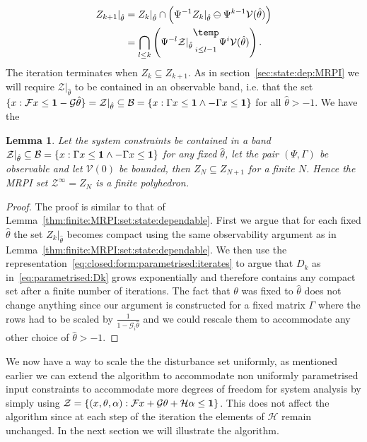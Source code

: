 \documentclass[letterpaper, 10pt, conference]{ieeeconf} %
\newtheorem{thm}{Lemma}[section]
\newcommand{\bigominus}{\raisebox{10pt}{$\temp$}}
\begin{document}
%
\begin{equation}\label{eq:closed:form:parametrised:iterates}
\begin{split}
	Z_{k+1}\vert_{\hat\theta} &= Z_{k}\vert_{\hat\theta}\cap\left(
	\Psi^{-1}Z_k\vert_{\hat\theta}\ominus\Psi^{k-1}\mathcal V(\hat\theta)\right)\\
	&=\bigcap_{l\leq k}\left(\Psi^{-l}\mathcal Z\vert_{\hat\theta}\underset{i\leq l-1}{\bigominus} 
	\Psi^i \mathcal V(\hat\theta)
	\right).
\end{split}
\end{equation}
%
The iteration terminates when $Z_k\subseteq Z_{k+1}$. As in section~\ref{sec:state:dep:MRPI}
we will require $\mathcal Z\vert_{\hat\theta}$ to be contained in an observable band, i.e. that 
the set $\{x:\mathcal Fx \leq {\bf{1}}-\mathcal G\hat\theta\}=\mathcal Z\vert_{\hat\theta}\subseteq
\mathcal B=\{x:\Gamma x\leq {\bf{1}}\wedge -\Gamma x\leq {\bf{1}}\}$ for all $\hat\theta>-1$. We have the
%
\begin{thm}
Let the system constraints be contained in a band $\mathcal Z\vert_{\hat\theta}\subseteq\mathcal 
B=\{x:\Gamma x\leq {\bf{1}}\wedge -\Gamma x\leq {\bf{1}}\}$ for any fixed $\hat\theta$, let the
pair $(\Psi,\Gamma)$ be observable and let $\mathcal V(0)$ be bounded, then $Z_N\subseteq Z_{N+1}$
for a finite $N$. Hence the MRPI set $\mathcal Z^\infty = Z_N$ is a finite polyhedron.
\end{thm}
%
\begin{proof}
The proof is similar to that of Lemma~\ref{thm:finite:MRPI:set:state:dependable}.
First we argue that for each fixed $\hat\theta$ the set $Z_k\vert_{\hat\theta}$ becomes compact using the same
observability argument as in Lemma~\ref{thm:finite:MRPI:set:state:dependable}.
We then use the representation~\eqref{eq:closed:form:parametrised:iterates} to argue that $D_k$ as
in~\eqref{eq:parametrised:Dk} grows exponentially and therefore contains any compact set after a finite number
of iterations. The fact that $\theta$ was fixed to $\hat\theta$ does not change anything since
our argument is constructed for a fixed matrix $\Gamma$ where the rows had to be scaled by 
$\frac{1}{1-\mathcal G_i\hat\theta}$ and we could rescale them to accommodate any other choice of $\hat\theta>-1$.
\end{proof}
We now have a way to scale the the disturbance set uniformly, as mentioned earlier we can extend the algorithm
to accommodate non uniformly parametrised input constraints to accommodate more degrees of freedom for 
system analysis by simply using $\mathcal Z = \{(x,\theta,\alpha): \mathcal F x + \mathcal G\theta + 
\mathcal H \alpha \leq {\bf{1}}\}$. This does not affect the algorithm since at each step of the iteration 
the elements of $\mathcal H$ remain unchanged. In the next section we will illustrate the algorithm.
%
%
%
%
%
%
\end{document}
